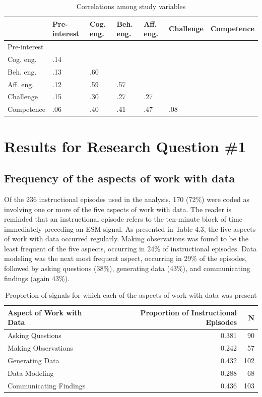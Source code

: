 \documentclass[]{msu-thesis}
\theoremstyle{definition}
\theoremstyle{definition}
\theoremstyle{definition}
\theoremstyle{remark}
\begin{document}
\begin{table}

\caption{\label{tab:unnamed-chunk-8}Correlations among study variables}
\centering
\begin{tabular}[t]{lllllll}
\toprule
 & Pre-interest & Cog. eng. & Beh. eng. & Aff. eng. & Challenge & Competence\\
\midrule
Pre-interest &  &  &  &  &  & \\
Cog. eng. & .14 &  &  &  &  & \\
Beh. eng. & .13 & .60 &  &  &  & \\
Aff. eng. & .12 & .59 & .57 &  &  & \\
Challenge & .15 & .30 & .27 & .27 &  & \\
Competence & .06 & .40 & .41 & .47 & .08 & \\
\bottomrule
\end{tabular}
\end{table}

\section{Results for Research Question
\#1}\label{results-for-research-question-1}

\subsection{Frequency of the aspects of work with
data}\label{frequency-of-the-aspects-of-work-with-data}

Of the 236 instructional episodes used in the analysis, 170 (72\%) were
coded as involving one or more of the five aspects of work with data.
The reader is reminded that an instructional episode refers to the
ten-minute block of time immediately preceding an ESM signal. As
presented in Table 4.3, the five aspects of work with data occurred
regularly. Making observations was found to be the least frequent of the
five aspects, occurring in 24\% of instructional episodes. Data modeling
was the next most frequent aspect, occurring in 29\% of the episodes,
followed by asking questions (38\%), generating data (43\%), and
communicating findings (again 43\%).

\begin{table}

\caption{\label{tab:unnamed-chunk-9}Proportion of signals for which each of the aspects of work with data was present}
\centering
\begin{tabular}[t]{lrr}
\toprule
Aspect of Work with Data & Proportion of Instructional Episodes & N\\
\midrule
Asking Questions & 0.381 & 90\\
Making Observations & 0.242 & 57\\
Generating Data & 0.432 & 102\\
Data Modeling & 0.288 & 68\\
Communicating Findings & 0.436 & 103\\
\bottomrule
\end{tabular}
\end{table}
\end{document}
